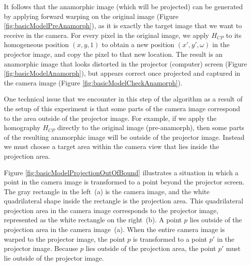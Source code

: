 \documentclass[11pt, oneside, reqno]{book}
\begin{document}
It follows that the anamorphic image (which will be projected) can be generated by applying forward warping on the original image (Figure \ref{fig:basicModelPreAnamorph}), as it is exactly the target image that we want to receive in the camera. For every pixel in the original image, we apply $H_{CP}$ to its homogeneous position $(x,y,1)$ to obtain a new position $(x', y', \omega)$ in the projector image, and copy the pixel to that new location. The result is an anamorphic image that looks distorted in the projector (computer) screen (Figure \ref{fig:basicModelAnamorph}), but appears correct once projected and captured in the camera image (Figure \ref{fig:basicModelCheckAnamorph}).

One technical issue that we encounter in this step of the algorithm as a result of the setup of this experiment is that some parts of the camera image correspond to the area outside of the projector image. For example, if we apply the homography $H_{CP}$ directly to the original image (pre-anamorph), then some parts of the resulting anamorphic image will be outside of the projector image. Instead we must choose a target area within the camera view that lies inside the projection area.


Figure \ref{fig:basicModelProjectionOutOfBound} illustrates a situation in which a point in the camera image is transformed to a point beyond the projector screen. The gray rectangle in the left~(a) is the camera image, and the white quadrilateral shape inside the rectangle is the projection area. This quadrilateral projection area in the camera image corresponds to the projector image, represented as the white rectangle on the right~(b). A point $p$ lies outside of the projection area in the camera image~(a). When the entire camera image is warped to the projector image, the point $p$ is transformed to a point $p'$ in the projector image. Because $p$ lies outside of the projection area, the point $p'$ must lie outside of the projector image.
\end{document}

